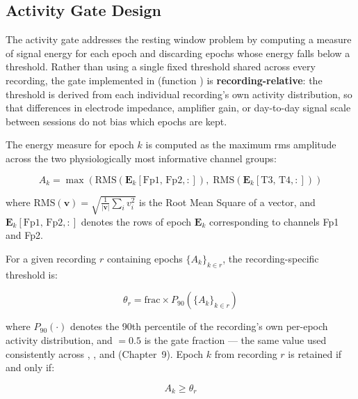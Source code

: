 \subsection{Activity Gate Design}

The activity gate addresses the resting window problem by
computing a measure of signal energy for each epoch and
discarding epochs whose energy falls below a threshold. Rather
than using a single fixed threshold shared across every
recording, the gate implemented in 
(function ) is \textbf{recording-relative}:
the threshold is derived from each individual recording's own
activity distribution, so that differences in electrode
impedance, amplifier gain, or day-to-day signal scale between
sessions do not bias which epochs are kept.

The energy measure for epoch $k$ is computed as the maximum
\acrshort{rms} amplitude across the two physiologically most
informative channel groups:

\begin{equation}
A_k = \max\!\left(
\text{RMS}\!\left(\mathbf{E}_k[\text{Fp1, Fp2}, :]\right),\;
\text{RMS}\!\left(\mathbf{E}_k[\text{T3, T4}, :]\right)
\right)
\label{eq:activity}
\end{equation}

\noindent where $\text{RMS}(\mathbf{v}) =
\sqrt{\frac{1}{|\mathbf{v}|}\sum_i v_i^2}$ is the Root Mean
Square of a vector, and $\mathbf{E}_k[\text{Fp1, Fp2}, :]$
denotes the rows of epoch $\mathbf{E}_k$ corresponding to
channels Fp1 and Fp2.

For a given recording $r$ containing epochs $\{A_k\}_{k \in r}$,
the recording-specific threshold is:

\begin{equation}
\theta_r = \text{frac} \times P_{90}\!\left(\{A_k\}_{k \in r}\right)
\label{eq:gate_threshold}
\end{equation}

\noindent where $P_{90}(\cdot)$ denotes the 90th percentile of
the recording's own per-epoch activity distribution, and
 $= 0.5$ is the gate fraction --- the same value used
consistently across ,
, and 
(Chapter~9). Epoch $k$ from recording $r$ is retained if and
only if:

\begin{equation}
A_k \geq \theta_r
\label{eq:gate_criterion}
\end{equation}

